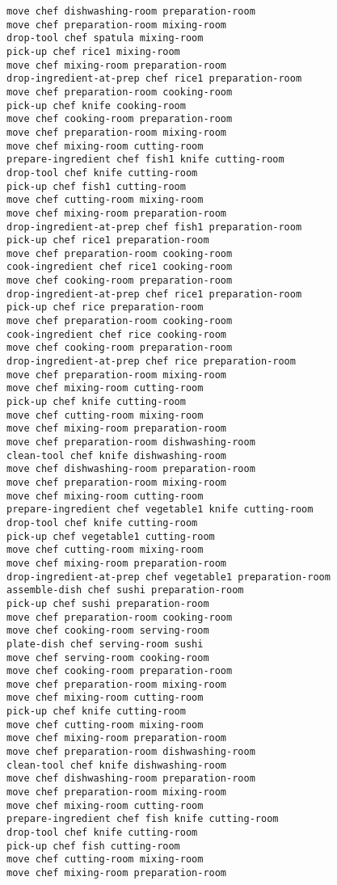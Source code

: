\documentclass[a4paper,12pt]{article}
\begin{document}
\begin{lstlisting}[language=PDDL, caption=Plan for Problem 2]
move chef dishwashing-room preparation-room 
move chef preparation-room mixing-room 
drop-tool chef spatula mixing-room 
pick-up chef rice1 mixing-room 
move chef mixing-room preparation-room 
drop-ingredient-at-prep chef rice1 preparation-room 
move chef preparation-room cooking-room 
pick-up chef knife cooking-room 
move chef cooking-room preparation-room 
move chef preparation-room mixing-room 
move chef mixing-room cutting-room 
prepare-ingredient chef fish1 knife cutting-room 
drop-tool chef knife cutting-room 
pick-up chef fish1 cutting-room 
move chef cutting-room mixing-room 
move chef mixing-room preparation-room 
drop-ingredient-at-prep chef fish1 preparation-room 
pick-up chef rice1 preparation-room 
move chef preparation-room cooking-room 
cook-ingredient chef rice1 cooking-room 
move chef cooking-room preparation-room 
drop-ingredient-at-prep chef rice1 preparation-room 
pick-up chef rice preparation-room 
move chef preparation-room cooking-room 
cook-ingredient chef rice cooking-room 
move chef cooking-room preparation-room 
drop-ingredient-at-prep chef rice preparation-room 
move chef preparation-room mixing-room 
move chef mixing-room cutting-room 
pick-up chef knife cutting-room 
move chef cutting-room mixing-room 
move chef mixing-room preparation-room 
move chef preparation-room dishwashing-room 
clean-tool chef knife dishwashing-room 
move chef dishwashing-room preparation-room 
move chef preparation-room mixing-room 
move chef mixing-room cutting-room 
prepare-ingredient chef vegetable1 knife cutting-room 
drop-tool chef knife cutting-room 
pick-up chef vegetable1 cutting-room 
move chef cutting-room mixing-room 
move chef mixing-room preparation-room 
drop-ingredient-at-prep chef vegetable1 preparation-room 
assemble-dish chef sushi preparation-room 
pick-up chef sushi preparation-room 
move chef preparation-room cooking-room 
move chef cooking-room serving-room 
plate-dish chef serving-room sushi 
move chef serving-room cooking-room 
move chef cooking-room preparation-room 
move chef preparation-room mixing-room 
move chef mixing-room cutting-room 
pick-up chef knife cutting-room 
move chef cutting-room mixing-room 
move chef mixing-room preparation-room 
move chef preparation-room dishwashing-room 
clean-tool chef knife dishwashing-room 
move chef dishwashing-room preparation-room 
move chef preparation-room mixing-room 
move chef mixing-room cutting-room 
prepare-ingredient chef fish knife cutting-room 
drop-tool chef knife cutting-room 
pick-up chef fish cutting-room 
move chef cutting-room mixing-room 
move chef mixing-room preparation-room 

\end{lstlisting}
\end{document}
